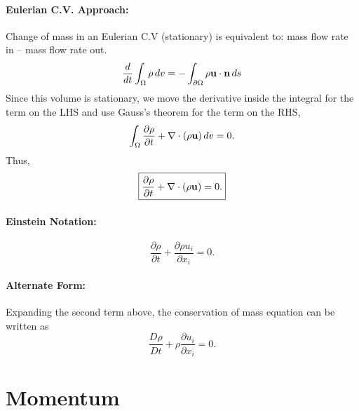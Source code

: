 \documentclass[oneside,a4paper,11pt]{report}
\begin{document}
\paragraph{Eulerian C.V. Approach:}
Change of mass in an Eulerian C.V (stationary) is equivalent to: mass flow rate in -- mass flow rate out. 
\begin{equation}
\frac{d}{dt}\int_\Omega \rho \,dv=-\int_{\partial \Omega} \rho \mathbf{u} \cdot \mathbf{n} \,ds
\end{equation}
Since this volume is stationary, we move the derivative inside the integral for the term on the LHS and use Gauss's theorem for the term on the RHS,
\begin{equation}
\int_\Omega \frac{\partial\rho}{\partial t}+\nabla\cdot(\rho\mathbf{u})\,dv=0 .
\end{equation}
Thus,
\begin{equation}
\label{eq:mass_conservation_vector}
\boxed{\frac{\partial\rho}{\partial t}+\nabla\cdot(\rho \mathbf{u})=0 .}
\end{equation}

\paragraph{Einstein Notation:}
\begin{equation}
\label{eq:mass_conservation_tensor}
\boxed{\frac{\partial\rho}{\partial t}+\frac{\partial\rho u_i}{\partial x_i}=0 .}
\end{equation}

\paragraph{Alternate Form:}
Expanding the second term above, the conservation of mass equation can be written as
\begin{equation}
\label{eq:mass_conservation_noncons}
\frac{D\rho}{Dt}+\rho \frac{\partial u_i}{\partial x_i} = 0.
\end{equation}

\section{Momentum}
\end{document}
